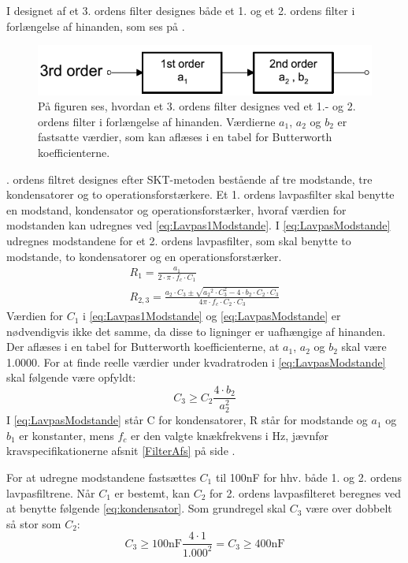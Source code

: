 \noindent I designet af et 3. ordens filter designes både et 1. og et 2. ordens filter i forlængelse af hinanden, som ses på .
\begin{figure}[H]
	\centering
	\includegraphics[scale=0.7]{figures/cProblemloesning/Filter_Orden.PNG}
	\caption{På figuren ses, hvordan et 3. ordens filter designes ved et 1.- og 2. ordens filter i forlængelse af hinanden. Værdierne $a_{1}$, $a_{2}$ og $b_{2}$ er fastsatte værdier, som kan aflæses i en tabel for Butterworth koefficienterne. \cite{Carter2013}}
	\label{fig:filter_Orden}
\end{figure}
. ordens filtret designes efter SKT-metoden bestående af tre modstande, tre kondensatorer og to operationsforstærkere. Et 1. ordens lavpasfilter skal benytte en modstand, kondensator og operationsforstærker, hvoraf værdien for modstanden kan udregnes ved \eqref{eq:Lavpas1Modstande}. I \eqref{eq:LavpasModstande} udregnes modstandene for et  2. ordens lavpasfilter, som skal benytte to modstande, to kondensatorer og en operationsforstærker. \cite{Carter2013}
\begin{eqnarray} \label{eq:Lavpas1Modstande}
R_{1} = \frac{a_1}{2 \cdot \pi \cdot f_c \cdot C_1} \\ 
\label{eq:LavpasModstande}R_{2,3} = \frac{a_2 \cdot C_3 \pm \sqrt{{a_2}^2 \cdot C_3^2 - 4 \cdot b_2 \cdot C_2 \cdot C_3}}{4 \pi \cdot f_c \cdot C_2 \cdot C_3}
\end{eqnarray}
\noindent Værdien for $C_{1}$ i \eqref{eq:Lavpas1Modstande} og \eqref{eq:LavpasModstande} er nødvendigvis ikke det samme, da disse to ligninger er uafhængige af hinanden. Der aflæses i en tabel for Butterworth koefficienterne, at $a_{1}$, $a_{2}$ og $b_{2}$ skal være 1.0000. For at finde reelle værdier under kvadratroden i \eqref{eq:LavpasModstande} skal følgende være opfyldt:
\begin{equation} \label{eq:kondensator}
C_3 \geq C_2 \frac{4 \cdot b_2}{a_2^2}
\end{equation}
I \eqref{eq:LavpasModstande} står C for kondensatorer, R står for modstande og $a_1$ og $b_1$ er konstanter, mens $f_c$ er den valgte knækfrekvens i Hz, jævnfør kravspecifikationerne afsnit \ref{FilterAfs} på side \pageref{FilterAfs}. 

\noindent For at udregne modstandene fastsættes $C_1$ til 100nF for hhv. både 1. og 2. ordens lavpasfiltrene. Når $C_1$ er bestemt, kan $C_2$ for 2. ordens lavpasfilteret beregnes ved at benytte følgende \eqref{eq:kondensator}. Som grundregel skal $C_3$ være over dobbelt så stor som $C_2$:
\begin{equation}  
C_3 \geq 100\text{nF} \frac{4\cdot 1}{1.000^2} = C_3 \geq 400\text{nF}
\end{equation}

